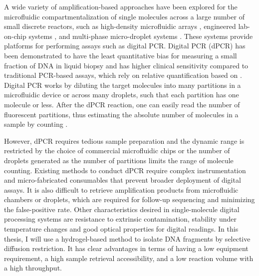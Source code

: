 A wide variety of amplification-based approaches have been explored for the microfluidic compartmentalization of single molecules across a large number of small discrete reactors, such as high-density microfluidic arrays \cite{Love:2013hf}, engineered lab-on-chip systems \cite{Thorsen:2002dn,Landry:2013dh,deBourcy:2014ji,Marcy:2007ip}, and multi-phase micro-droplet systems \cite{Fu:2015gl,Thorsen:2001td,Hindson:2011fg,Morinishi:2015jx}. These systems provide platforms for performing assays such as digital PCR. Digital PCR (dPCR) has been demonstrated to have the least quantitative bias for measuring a small fraction of DNA in liquid biopsy and has higher clinical sensitivity compared to traditional PCR-based assays, which rely on relative quantification based on  \cite{Lun:2008cp,Bengtsson:2005ep,Wills:2013ht}. Digital PCR works by diluting the target molecules into many partitions in a microfluidic device or across many droplets, such that each partition has one molecule or less. After the dPCR reaction, one can easily read the number of fluorescent partitions, thus estimating the absolute number of molecules in a sample by counting \cite{Vogelstain:1999ve}. 

However, dPCR requires tedious sample preparation and the dynamic range is restricted by the choice of commercial microfluidic chips or the number of droplets generated \cite{Hindson:2011fg} as the number of partitions limits the range of molecule counting. Existing methods to conduct dPCR require complex instrumentation and micro-fabricated consumables that prevent broader deployment of digital assays. It is also difficult to retrieve amplification products from microfluidic chambers or droplets, which are required for follow-up sequencing and minimizing the false-positive rate. Other characteristics desired in single-molecule digital processing systems are resistance to extrinsic contamination, stability under temperature changes and good optical properties for digital readings. In this thesis, I will use a hydrogel-based method to isolate DNA fragments by selective diffusion restriction. It has clear advantages in terms of having a low equipment requirement, a high sample retrieval accessibility, and a low reaction volume with a high throughput. 


